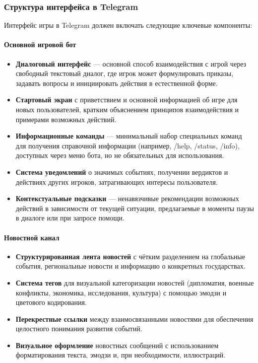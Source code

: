 \subsubsection{Структура интерфейса в Telegram}

Интерфейс игры в Telegram должен включать следующие ключевые компоненты:

\paragraph{Основной игровой бот}

\begin{itemize}
    \item \textbf{Диалоговый интерфейс} — основной способ взаимодействия с игрой через свободный текстовый диалог, где игрок может формулировать приказы, задавать вопросы и инициировать действия в естественной форме.

    \item \textbf{Стартовый экран} с приветствием и основной информацией об игре для новых пользователей, кратким объяснением принципов взаимодействия и примерами возможных действий.

    \item \textbf{Информационные команды} — минимальный набор специальных команд для получения справочной информации (например, /help, /status, /info), доступных через меню бота, но не обязательных для использования.

    \item \textbf{Система уведомлений} о значимых событиях, получении вердиктов и действиях других игроков, затрагивающих интересы пользователя.

    \item \textbf{Контекстуальные подсказки} — ненавязчивые рекомендации возможных действий в зависимости от текущей ситуации, предлагаемые в моменты паузы в диалоге или при запросе помощи.
\end{itemize}

\paragraph{Новостной канал}

\begin{itemize}
    \item \textbf{Структурированная лента новостей} с чётким разделением на глобальные события, региональные новости и информацию о конкретных государствах.

    \item \textbf{Система тегов} для визуальной категоризации новостей (дипломатия, военные конфликты, экономика, исследования, культура) с помощью эмодзи и цветового кодирования.

    \item \textbf{Перекрестные ссылки} между взаимосвязанными новостями для обеспечения целостного понимания развития событий.

    \item \textbf{Визуальное оформление} новостных сообщений с использованием форматирования текста, эмодзи и, при необходимости, иллюстраций.
\end{itemize}

